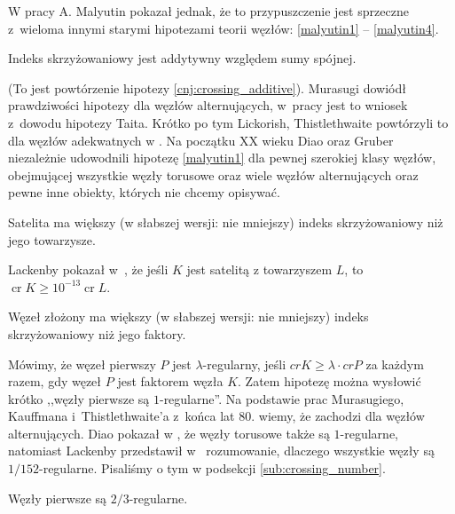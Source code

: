 W pracy \cite{malyutin16} A. Malyutin pokazał jednak, że to przypuszczenie jest sprzeczne z~wieloma innymi starymi hipotezami teorii węzłów: \ref{malyutin1} -- \ref{malyutin4}.

\begin{conjecture}
    \label{malyutin1}
    Indeks skrzyżowaniowy jest addytywny względem sumy spójnej.
\end{conjecture}

(To jest powtórzenie hipotezy \ref{cnj:crossing_additive}).
Murasugi dowiódł prawdziwości hipotezy dla węzłów alternujących, w~pracy \cite{murasugi87} jest to wniosek z~dowodu hipotezy Taita.
Krótko po tym Lickorish, Thistlethwaite powtórzyli to dla węzłów adekwatnych w \cite{lickorish88}.
Na początku XX wieku Diao \cite{diao04} oraz Gruber \cite{gruber03} niezależnie udowodnili hipotezę \ref{malyutin1} dla pewnej szerokiej klasy węzłów, obejmującej wszystkie węzły torusowe oraz wiele węzłów alternujących oraz pewne inne obiekty, których nie chcemy opisywać.

\begin{conjecture}
    Satelita ma większy (w słabszej wersji: nie mniejszy) indeks skrzyżowaniowy niż jego towarzysze.
\end{conjecture}

Lackenby pokazał w~\cite{lackenby14}, że jeśli $K$ jest satelitą z towarzyszem $L$, to $\operatorname{cr} K \ge 10^{-13} \operatorname{cr} L$.

\begin{conjecture}
    Węzeł złożony ma większy (w słabszej wersji: nie mniejszy) indeks skrzyżowaniowy niż jego faktory.
\end{conjecture}

Mówimy, że węzeł pierwszy $P$ jest $\lambda$-regularny, jeśli $cr K \ge \lambda \cdot cr P$ za każdym razem, gdy węzeł $P$ jest faktorem węzła $K$.
Zatem hipotezę można wysłowić krótko ,,węzły pierwsze są $1$-regularne''.
Na podstawie prac Murasugiego, Kauffmana i~Thistlethwaite'a z~końca lat 80. wiemy, że zachodzi dla węzłów alternujących.
Diao pokazał w \cite[tw. 3.8]{diao04}, że węzły torusowe także są $1$-regularne, natomiast Lackenby przedstawił w~\cite{lackenby09} rozumowanie, dlaczego wszystkie węzły są $1/152$-regularne.
Pisaliśmy o tym w podsekcji \ref{sub:crossing_number}.

\begin{conjecture}
    \label{malyutin4}
    Węzły pierwsze są $2/3$-regularne.
\end{conjecture}

